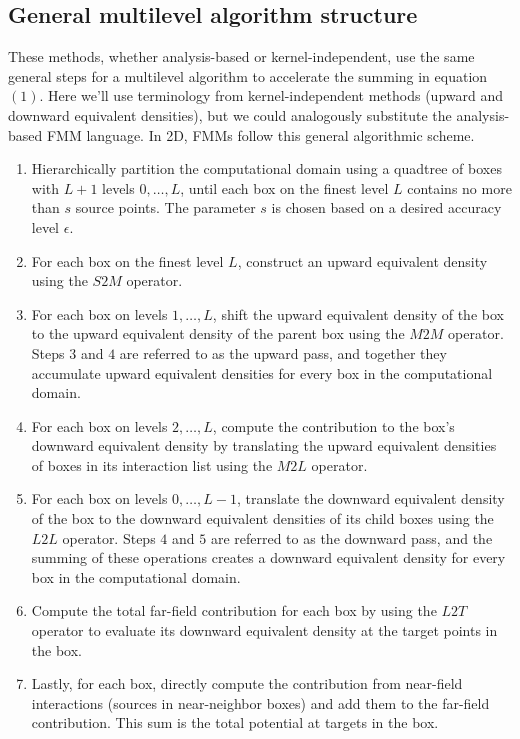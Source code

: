 \documentclass[11pt, oneside]{article}   	%
\begin{document}
\subsection{General multilevel algorithm structure}
These methods, whether analysis-based or kernel-independent, use the same general steps for a multilevel algorithm to accelerate the summing in equation $(1)$. Here we'll use terminology from kernel-independent methods (upward and downward equivalent densities), but we could analogously substitute the analysis-based FMM language. In 2D, FMMs follow this general algorithmic scheme.
\begin{enumerate}
\item Hierarchically partition the computational domain using a quadtree of boxes with $L+1$ levels $0,\dots,L$, until each box on the finest level $L$ contains no more than $s$ source points. The parameter $s$ is chosen based on a desired accuracy level $\epsilon$.
\item For each box on the finest level $L$, construct an upward equivalent density using the $S2M$ operator.
\item For each box on levels $1,\dots,L$, shift the upward equivalent density of the box to the upward equivalent density of the parent box using the $M2M$ operator. Steps $3$ and $4$ are referred to as the upward pass, and together they accumulate upward equivalent densities for every box in the computational domain.
\item For each box on levels $2,\dots,L$, compute the contribution to the box's downward equivalent density by translating the upward equivalent densities of boxes in its interaction list using the $M2L$ operator.
\item For each box on levels $0,\dots,L-1$, translate the downward equivalent density of the box to the downward equivalent densities of its child boxes using the $L2L$ operator. Steps $4$ and $5$ are referred to as the downward pass, and the summing of these operations creates a downward equivalent density for every box in the computational domain.
\item Compute the total far-field contribution for each box by using the $L2T$ operator to evaluate its downward equivalent density at the target points in the box.
\item Lastly, for each box, directly compute the contribution from near-field interactions (sources in near-neighbor boxes) and add them to the far-field contribution. This sum is the total potential at targets in the box.
\end{enumerate}
\end{document}
